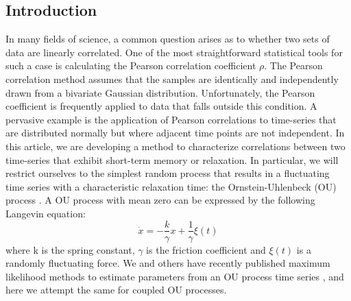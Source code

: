 \documentclass[%
 reprint,
 amsmath,amssymb,
 aps,
]{revtex4-1}
\begin{document}
\maketitle

\subsection{Introduction}
In many fields of science, a common question arises as to whether two sets of data are linearly correlated.  One of the most straightforward statistical tools for such a case is calculating the Pearson correlation coefficient $\rho$.  The Pearson correlation method assumes that the samples are identically and independently drawn from a bivariate Gaussian distribution.  Unfortunately, the Pearson coefficient is frequently applied to data that falls outside this condition. A pervasive example is the application of Pearson correlations to time-series that are distributed normally but where adjacent time points are not independent.  In this article, we are developing a method to characterize correlations between two time-series that exhibit short-term memory or relaxation.  In particular, we will restrict ourselves to the simplest random process that results in a fluctuating time series with a characteristic relaxation time: the Ornstein-Uhlenbeck (OU) process \cite{RN28}.  A OU process with mean zero can be expressed by the following Langevin equation:
\begin{equation}
\dot x =  - \frac{k}{\gamma }x + \frac{1}{\gamma }\xi(t)
\label{model}
\end{equation}
where k is the spring constant, $\gamma$ is the friction coefficient and $\xi(t)$ is a randomly fluctuating force.  
We and others have recently published maximum likelihood methods to estimate parameters from an OU process time series \cite{RN91,RN51,RN62}, and here we attempt the same for coupled OU processes.
\end{document}
